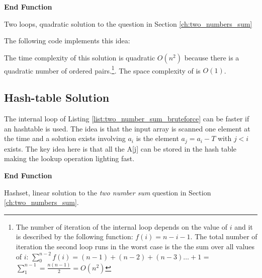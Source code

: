 \begin{algorithm}
	\SetAlgoLined
	

	\textbf{End Function}
	
	\label{algo:two_number_sum_bruteforce}
	\caption{Two loops, quadratic solution to the question in Section \ref{ch:two_numbers_sum} }
\end{algorithm}
The following code implements this idea:



The time complexity of this solution is quadratic $O(n^2)$ because there is a quadratic number of ordered pairs.\footnote{The number of iteration of the internal loop depends on the value of $i$ and it is described by the following function: $f(i) = n-i-1$. The total number of iteration the second loop runs in the worst case is the the sum over all values of $i$: $\sum_{0}^{n-2}f(i) = (n-1) + (n-2) + (n-3) \dots + 1$ = $\sum_{1}^{n-1} = \frac{n(n-1)}{2} = O(n^2)$}. The space complexity of is $O(1)$.

\subsection{Hash-table Solution}
The internal loop of Listing \ref{list:two_number_sum_bruteforce} can be faster if an hashtable is used. The idea is that the input array is scanned one element at the time and a solution exists involving $a_i$ is the element $a_j  = a_i-T$ with $j < i$ exists. The key idea here is that all the A[j] can be stored in the hash table making the lookup operation lighting fast. 

\begin{algorithm}[H]
	
    \textbf{End Function}

	\label{algo:two_number_sum_hashset}
	\caption{Hashset, linear solution to the \textit{two number sum} question in Section \ref{ch:two_numbers_sum}.}
\end{algorithm}


